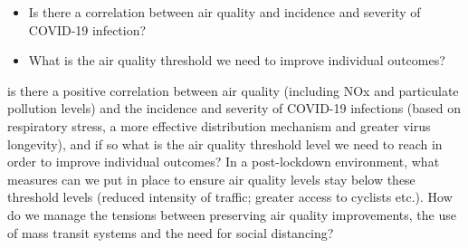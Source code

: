 \begin{itemize}
\item Is there a correlation between air quality and incidence and severity of COVID-19 infection?
\item What is the air quality threshold we need to improve individual outcomes?
\end{itemize}

is there a positive correlation between air quality (including NOx and particulate pollution levels) and the incidence and severity of COVID-19 infections (based on respiratory stress, a more effective distribution mechanism and greater virus longevity), and if so what is the air quality threshold level we need to reach in order to improve individual outcomes? In a post-lockdown environment, what measures can we put in place to ensure air quality levels stay below these threshold levels (reduced intensity of traffic; greater access to cyclists etc.). How do we manage the tensions between preserving air quality improvements, the use of mass transit systems and the need for social distancing? 